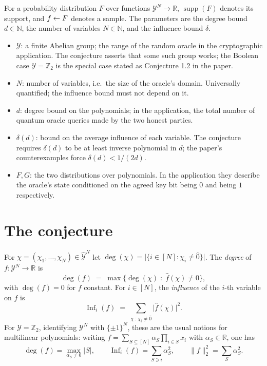\documentclass{aicr-conjecture}
\newcommand{\Yc}{\mathcal{Y}}
\newcommand{\Yd}{\hat{\mathcal{Y}}}
\newcommand{\zc}{\hat{0}}
\begin{document}
For a probability distribution $F$ over functions
$\Yc^N \to \mathbb{R}$, $\operatorname{supp}(F)$ denotes its support,
and $f \leftarrow F$ denotes a sample. The parameters are the degree bound
$d \in \mathbb{N}$, the number of variables $N \in \mathbb{N}$, and the
influence bound $\delta$.

\begin{itemize}
\item $\Yc$: a finite Abelian group; the range of the random oracle in
  the cryptographic application. The conjecture asserts that some such
  group works; the Boolean case $\Yc = \mathbb{Z}_2$ is the special case
  stated as Conjecture 1.2 in the paper.
\item $N$: number of variables, i.e.\ the size of the oracle's domain.
  Universally quantified; the influence bound must not depend on it.
\item $d$: degree bound on the polynomials; in the application, the
  total number of quantum oracle queries made by the two honest parties.
\item $\delta(d)$: bound on the average influence of each variable. The
  conjecture requires $\delta(d)$ to be at least inverse polynomial in
  $d$; the paper's counterexamples force $\delta(d) < 1/(2d)$.
\item $F, G$: the two distributions over polynomials. In the application
  they describe the oracle's state conditioned on the agreed key bit
  being $0$ and being $1$ respectively.
\end{itemize}

\section{The conjecture}\label{sec:conjectures}

\begin{definition}\label{def:deginf}
For $\chi = (\chi_1, \dots, \chi_N) \in \Yd^N$ let
$\deg(\chi) = \bigl|\{ i \in [N] : \chi_i \ne \zc \}\bigr|$. The
\emph{degree} of $f \colon \Yc^N \to \mathbb{R}$ is
\[
  \deg(f) \;=\; \max\{ \deg(\chi) \;:\; \hat{f}(\chi) \ne 0 \},
\]
with $\deg(f) = 0$ for $f$ constant. For $i \in [N]$, the
\emph{influence} of the $i$-th variable on $f$ is
\[
  \operatorname{Inf}_i(f) \;=\;
  \sum_{\chi \,:\, \chi_i \ne \zc} \bigl|\hat{f}(\chi)\bigr|^2 .
\]
For $\Yc = \mathbb{Z}_2$, identifying $\Yc^N$ with $\{\pm 1\}^N$, these
are the usual notions for multilinear polynomials: writing
$f = \sum_{S \subseteq [N]} \alpha_S \prod_{i \in S} x_i$ with
$\alpha_S \in \mathbb{R}$, one has
\[
  \deg(f) = \max_{\alpha_S \ne 0} |S|, \qquad
  \operatorname{Inf}_i(f) = \sum_{S \ni i} \alpha_S^2, \qquad
  \|f\|_2^2 = \sum_S \alpha_S^2 .
\]
\end{definition}
\end{document}
